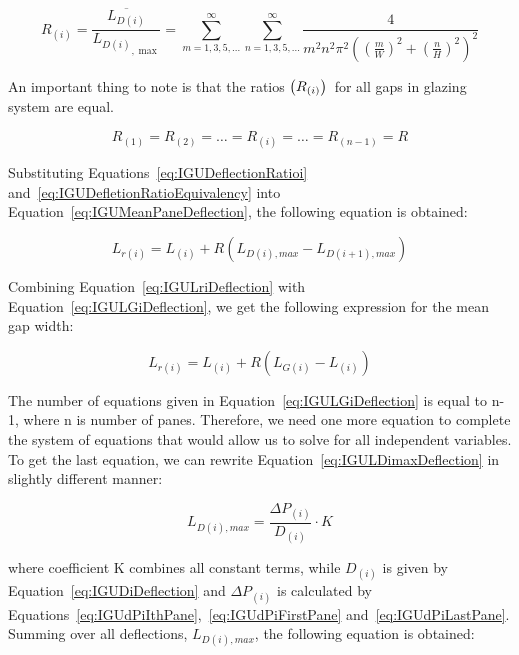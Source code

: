 \begin{equation}
{R_{(i)}} = \frac{{\overline {{L_{D(i)}}} }}{{{L_{D(i)}}_{,\max }}} = \sum\limits_{m = 1,3,5,...}^\infty  {\sum\limits_{n = 1,3,5,...}^\infty  {\frac{4}{{{m^2}{n^2}{\pi ^2}{{\left( {{{(\frac{m}{W})}^2} + {{(\frac{n}{H})}^2}} \right)}^2}}}} }
\label{eq:IGUDeflectionRatioi}
\end{equation}

An important thing to note is that the ratios $\left(R_{\left(i\right)}\right)$\ for all gaps in glazing system are equal.

\begin{equation}
{R_{\left( 1 \right)}} = {R_{\left( 2 \right)}} =  \ldots  = {R_{\left( i \right)}} =  \ldots  = {R_{\left( {n - 1} \right)}} = R
\label{eq:IGUDefletionRatioEquivalency}
\end{equation}

Substituting Equations~\ref{eq:IGUDeflectionRatioi} and~\ref{eq:IGUDefletionRatioEquivalency} into Equation~\ref{eq:IGUMeanPaneDeflection}, the following equation is obtained:

\begin{equation}
{L_{r\left( i \right)}} = {L_{\left( i \right)}} + R\left( {{L_{D\left( i \right),max}} - {L_{D\left( {i + 1} \right),max}}} \right)
\label{eq:IGULriDeflection}
\end{equation}

Combining Equation~\ref{eq:IGULriDeflection} with Equation~\ref{eq:IGULGiDeflection}, we get the following expression for the mean gap width:

\begin{equation}
{L_{r\left( i \right)}} = {L_{\left( i \right)}} + R\left( {{L_{G\left( i \right)}} - {L_{\left( i \right)}}} \right)
\end{equation}

The number of equations given in Equation~\ref{eq:IGULGiDeflection} is equal to n-1, where n is number of panes. Therefore, we need one more equation to complete the system of equations that would allow us to solve for all independent variables. To get the last equation, we can rewrite Equation~\ref{eq:IGULDimaxDeflection} in slightly different manner:

\begin{equation}
{L_{D\left( i \right),max}} = \frac{{\Delta {P_{\left( i \right)}}}}{{{D_{\left( i \right)}}}}\cdot K
\end{equation}

where coefficient K combines all constant terms, while \({D_{\left( i \right)}}\) is given by Equation~\ref{eq:IGUDiDeflection} and \(\Delta {P_{\left( i \right)}}\) is calculated by Equations~\ref{eq:IGUdPiIthPane},~\ref{eq:IGUdPiFirstPane} and~\ref{eq:IGUdPiLastPane}. Summing over all deflections, \({L_{D\left( i \right),max}}\), the following equation is obtained:


